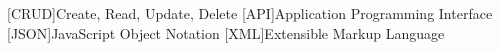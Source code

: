 [CRUD]{Create, Read, Update, Delete}
[API]{Application Programming Interface}
[JSON]{JavaScript Object Notation}
[XML]{Extensible Markup Language}